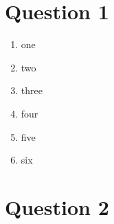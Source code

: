 \documentclass[11pt]{article}
\begin{document}

\section*{Question 1}

\begin{enumerate}[label=(\alph*)]

  \item one

  \item two

  \item three

  \item four

  \item five

  \item six

\end{enumerate}



\section*{Question 2}
\end{document}
